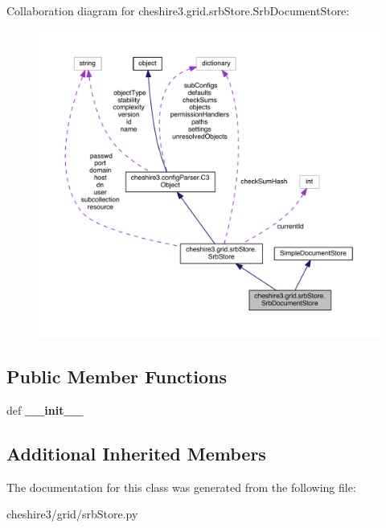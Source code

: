 Collaboration diagram for cheshire3.\-grid.\-srb\-Store.\-Srb\-Document\-Store\-:
\nopagebreak
\begin{figure}[H]
\begin{center}
\leavevmode
\includegraphics[width=350pt]{classcheshire3_1_1grid_1_1srb_store_1_1_srb_document_store__coll__graph}
\end{center}
\end{figure}
\subsection*{Public Member Functions}
\begin{DoxyCompactItemize}
\item 
\hypertarget{classcheshire3_1_1grid_1_1srb_store_1_1_srb_document_store_af7b7e775815d3ba656180d93c5cb0bcc}{def {\bfseries \-\_\-\-\_\-init\-\_\-\-\_\-}}\label{classcheshire3_1_1grid_1_1srb_store_1_1_srb_document_store_af7b7e775815d3ba656180d93c5cb0bcc}

\end{DoxyCompactItemize}
\subsection*{Additional Inherited Members}


The documentation for this class was generated from the following file\-:\begin{DoxyCompactItemize}
\item 
cheshire3/grid/srb\-Store.\-py\end{DoxyCompactItemize}
